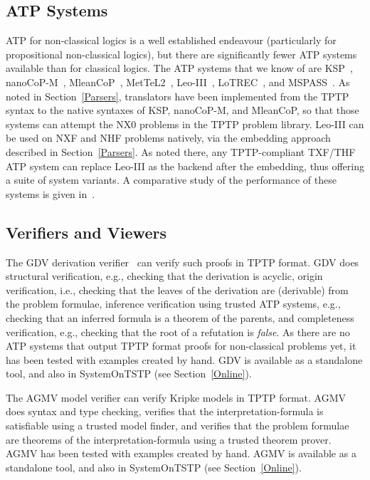 \documentclass{ceurart}
\begin{document}
\subsection{ATP Systems}
\label{ATPSystems}

ATP for non-classical logics is a well established endeavour (particularly for propositional
non-classical logics), but there are significantly fewer ATP systems available than for classical 
logics.
The ATP systems that we know of are KSP~\cite{NHD20,PN+21}, nanoCoP-M~\cite{Ott21}, 
MleanCoP~\cite{Ott14}, MetTeL2~\cite{TSK12}, Leo-III~\cite{SB21}, LoTREC~\cite{FF+01}, and 
MSPASS~\cite{HS00-TABLEAUX}.
As noted in Section~\ref{Parsers}, translators have been implemented from the TPTP syntax to the 
native syntaxes of KSP, nanoCoP-M, and MleanCoP, so that those systems can attempt the NX0 
problems in the TPTP problem library.
Leo-III can be used on NXF and NHF problems natively, via the embedding approach described 
in Section~\ref{Parsers}.
As noted there, any TPTP-compliant TXF/THF ATP system can replace Leo-III as the backend after
the embedding, thus offering a suite of system variants.
A comparative study of the performance of these systems is given in~\cite{SS+23}.

\subsection{Verifiers and Viewers}
\label{Verifiers}

The GDV derivation verifier~\cite{Sut06} can verify such proofs in TPTP format.
GDV does structural verification, e.g., checking that the derivation is acyclic, origin 
verification, i.e., checking that the leaves of the derivation are (derivable) from the problem 
formulae, inference verification using trusted ATP systems, e.g., checking that an inferred 
formula is a theorem of the parents, and completeness verification, e.g., checking that the root 
of a refutation is {\em false}.
As there are no ATP systems that output TPTP format proofs for non-classical problems yet, 
it has been tested with examples created by hand.
GDV is available as a standalone tool, and also in SystemOnTSTP (see Section~\ref{Online}).

The AGMV model verifier \cite{SS+23-LPAR} can verify Kripke models in TPTP format.
AGMV does syntax and type checking, verifies that the interpretation-formula is satisfiable
using a trusted model finder, and verifies that the problem formulae are theorems of the
interpretation-formula using a trusted theorem prover.
AGMV has been tested with examples created by hand.
AGMV is available as a standalone tool, and also in SystemOnTSTP (see Section~\ref{Online}).
\end{document}
